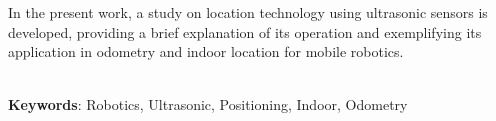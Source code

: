 \begin{thesisabastract}
In the present work, a study on location technology using ultrasonic sensors is developed, providing a brief explanation of its operation and exemplifying its application in odometry and indoor location for mobile robotics.

\ \\


\textbf{Keywords}: Robotics, Ultrasonic, Positioning, Indoor, Odometry

\end{thesisabastract}
